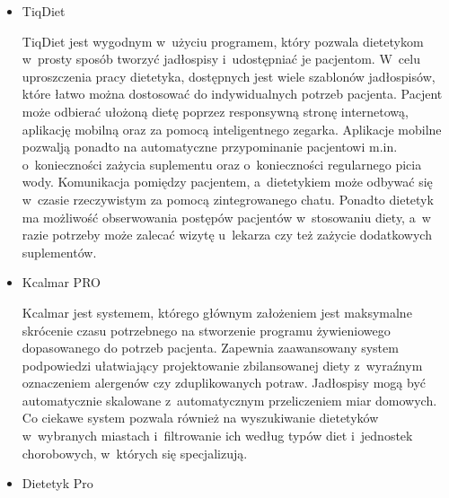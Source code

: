 \begin{itemize}
    \item TiqDiet

        TiqDiet\cite{url:TiqDiet} jest wygodnym w~użyciu programem, który pozwala dietetykom w~prosty sposób tworzyć jadłospisy i~udostępniać je pacjentom.
        W~celu uproszczenia pracy dietetyka, dostępnych jest wiele szablonów jadłospisów, które łatwo można dostosować do indywidualnych potrzeb pacjenta.
        Pacjent może odbierać ułożoną dietę poprzez responsywną stronę internetową, aplikację mobilną oraz za pomocą inteligentnego zegarka.
        Aplikacje mobilne pozwalją ponadto na automatyczne przypominanie pacjentowi m.in. o~konieczności zażycia suplementu oraz o~konieczności regularnego picia wody.
        Komunikacja pomiędzy pacjentem, a~dietetykiem może odbywać się w~czasie rzeczywistym za pomocą zintegrowanego chatu.
        Ponadto dietetyk ma możliwość obserwowania postępów pacjentów w~stosowaniu diety, a~w razie potrzeby może zalecać wizytę u~lekarza czy też zażycie dodatkowych suplementów.
%
    \item Kcalmar PRO

        Kcalmar\cite{url:kcalmar} jest systemem, którego głównym założeniem jest maksymalne skrócenie czasu potrzebnego na stworzenie programu żywieniowego dopasowanego do potrzeb pacjenta.
        Zapewnia zaawansowany system podpowiedzi ułatwiający projektowanie zbilansowanej diety z~wyraźnym oznaczeniem alergenów czy zduplikowanych potraw.
        Jadłospisy mogą być automatycznie skalowane z~automatycznym przeliczeniem miar domowych.
        Co ciekawe system pozwala również na wyszukiwanie dietetyków w~wybranych miastach i~filtrowanie ich według typów diet i~jednostek chorobowych, w~których się specjalizują.
%
    \item Dietetyk Pro


\end{itemize}
